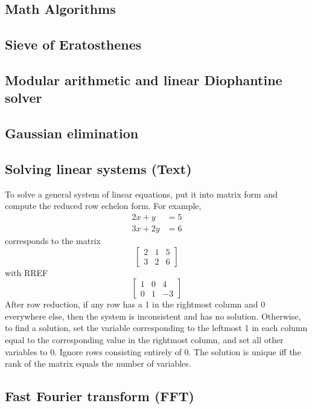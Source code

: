 \documentclass[10pt]{extarticle}
\begin{document}
\begin{multicols*}{2}
\section{Math Algorithms}

\subsection{Sieve of Eratosthenes} %


\subsection{Modular arithmetic and linear Diophantine solver} %


\subsection{Gaussian elimination} %



\subsection{Solving linear systems (Text)} %
To solve a general system of linear equations, put it into matrix form and
compute the reduced row echelon form. For example,
\begin{align*}2x + y &= 5 \\ 3x + 2y &= 6\end{align*}
corresponds to the matrix
\[ \left[ \begin{array}{cc|c} 2 & 1 & 5 \\ 3 & 2 & 6 \end{array} \right] \]
with RREF
\[ \left[ \begin{array}{cc|c} 1 & 0 & 4 \\ 0 & 1 & -3 \end{array} \right] \]
After row reduction, if any row has a 1 in the rightmost column and 0
everywhere else, then the system is inconsistent and has no solution.
Otherwise, to find a solution, set the variable corresponding to the leftmost 1
in each column equal to the corresponding value in the rightmost column, and
set all other variables to 0. Ignore rows consisting entirely of 0. The
solution is unique iff the rank of the matrix equals the number of variables.

\subsection{Fast Fourier transform (FFT)} %





\end{multicols*}
\end{document}
